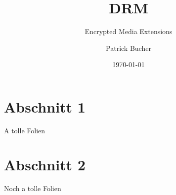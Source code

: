 \documentclass{beamer}
\begin{document}
\title{DRM}
\subtitle{Encrypted Media Extensions}
\author{Patrick Bucher}
\date{\today}
\maketitle

\frame{\tableofcontents}

\section{Abschnitt 1}
\begin{frame}
A tolle Folien
\end{frame}

\section{Abschnitt 2}
\begin{frame}
Noch a tolle Folien
\end{frame}
\end{document}
